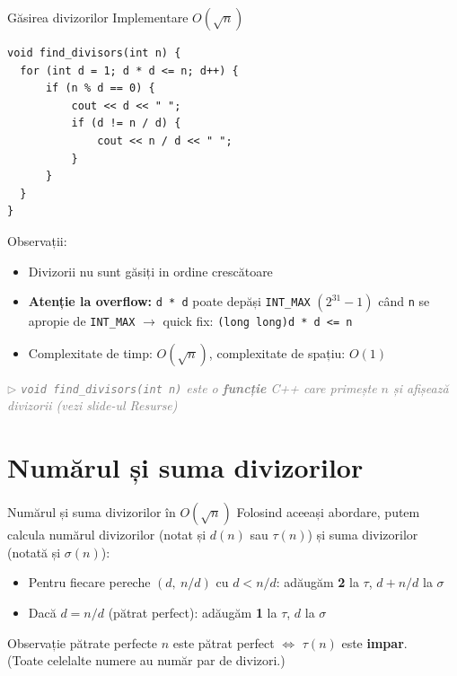 ﻿\documentclass{beamer}
\newcommand{\beginnote}[1]{%
  \vfill
  {\footnotesize\textcolor{gray}{\textit{$\triangleright$ #1 (vezi slide-ul \emph{Resurse})}}}%
}
\begin{document}
\begin{frame}{Găsirea divizorilor \textemdash{} Implementare $O(\sqrt{n})$}
  \begin{lstlisting}
void find_divisors(int n) {
  for (int d = 1; d * d <= n; d++) {
      if (n % d == 0) {
          cout << d << " ";
          if (d != n / d) {
              cout << n / d << " ";
          }
      }
  }
}
  \end{lstlisting}
  \bigskip
  Observații:
  \begin{itemize}
    \item Divizorii nu sunt găsiți in ordine crescătoare
    \item \textbf{Atenție la overflow:} \lstinline|d * d| poate depăși \lstinline|INT_MAX| $(2^{31}-1)$ când \lstinline|n| se apropie de \lstinline|INT_MAX| $\rightarrow$ quick fix: \lstinline|(long long)d * d <= n|
    \item Complexitate de timp: $O(\sqrt{n})$, complexitate de spațiu: $O(1)$
  \end{itemize}
  \beginnote{\lstinline|void find_divisors(int n)| este o \textbf{funcție} C++ care primește $n$ și afișează divizorii}
\end{frame}

\section{Numărul și suma divizorilor}

\begin{frame}{Numărul și suma divizorilor în $O(\sqrt{n})$}
  Folosind aceeași abordare, putem calcula numărul divizorilor (notat și $d(n)$ sau $\tau(n)$) și suma divizorilor (notată și $\sigma(n)$):
  \bigskip
  \begin{itemize}
    \item Pentru fiecare pereche $(d,\ n/d)$ cu $d < n/d$: adăugăm \textbf{2} la $\tau$, $d + n/d$ la $\sigma$
    \item Dacă $d = n/d$ (pătrat perfect): adăugăm \textbf{1} la $\tau$, $d$ la $\sigma$
  \end{itemize}
  \bigskip
  \begin{block}{Observație \textemdash{} pătrate perfecte}
    $n$ este pătrat perfect $\Leftrightarrow$ $\tau(n)$ este \textbf{impar}. \\
    (Toate celelalte numere au număr par de divizori.)
  \end{block}
\end{frame}
\end{document}

